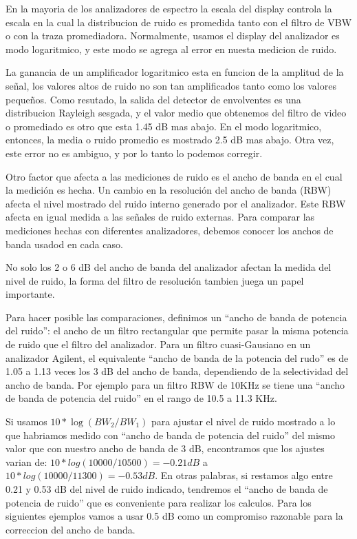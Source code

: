 \documentclass[a4paper,12pt,twoside]{article}
\newcommand{\quotes}[1]{``#1''}
\begin{document}
En la mayoria de los analizadores de espectro la escala del display controla la escala en la cual la distribucion de ruido es promedida tanto con el filtro de VBW o con la traza promediadora. Normalmente, usamos el display del analizador es modo logaritmico, y este modo se agrega al error en nuesta medicion de ruido.\newline

La ganancia de un amplificador logaritmico esta en funcion de la amplitud de la señal, los valores altos de ruido no son tan amplificados tanto como los valores pequeños. Como resutado, la salida del detector de envolventes es una distribucion Rayleigh sesgada, y el valor medio que obtenemos del filtro de video o promediado es otro que esta 1.45 dB mas abajo. En el modo logaritmico, entonces, la media o ruido promedio es mostrado 2.5 dB mas abajo.
Otra vez, este error no es ambiguo, y por lo tanto lo podemos corregir.\newline

Otro factor que afecta a las mediciones de ruido es el ancho de banda en el cual la medición es hecha. Un cambio en la resolución del ancho de banda (RBW) afecta el nivel mostrado del ruido interno generado por el analizador. Este RBW afecta en igual medida a las señales de ruido externas. Para comparar las mediciones hechas con diferentes analizadores, debemos conocer los anchos de banda usadod en cada caso.\newline

No solo los 2 o 6 dB del ancho de banda del analizador afectan la medida del nivel de ruido, la forma del filtro  de resolución tambien juega un papel importante.\newline

Para hacer posible las comparaciones, definimos un \quotes{ancho de banda de potencia del ruido}: el ancho de un filtro rectangular que permite pasar la misma potencia de ruido que el filtro del  analizador. Para un filtro cuasi-Gausiano en un analizador Agilent, el equivalente \quotes{ancho de banda de la potencia del rudo} es de 1.05 a 1.13 veces los 3 dB del ancho de banda, dependiendo de la selectividad del ancho de banda. Por ejemplo para un filtro RBW de 10KHz se tiene una \quotes{ancho de banda de potencia del ruido} en el rango de 10.5 a 11.3 KHz.\newline

Si usamos $10*\log(BW_{2}/BW_{1})$ para ajustar el nivel de ruido mostrado a lo que habriamos medido con \quotes{ancho de banda de potencia del ruido} del mismo valor que con nuestro ancho de banda de 3 dB, encontramos que los ajustes varian de: $10*log(10000/10500) = -0.21dB$ a $10*log(10000/11300)=-0.53 dB$. En otras palabras, si restamos algo entre 0.21 y 0.53 dB del nivel de ruido indicado, tendremos el \quotes{ancho de banda de potencia de ruido} que es conveniente para realizar los calculos. Para los siguientes ejemplos vamos a usar 0.5 dB como un compromiso razonable para la correccion del ancho de banda.
\newline
\end{document}
